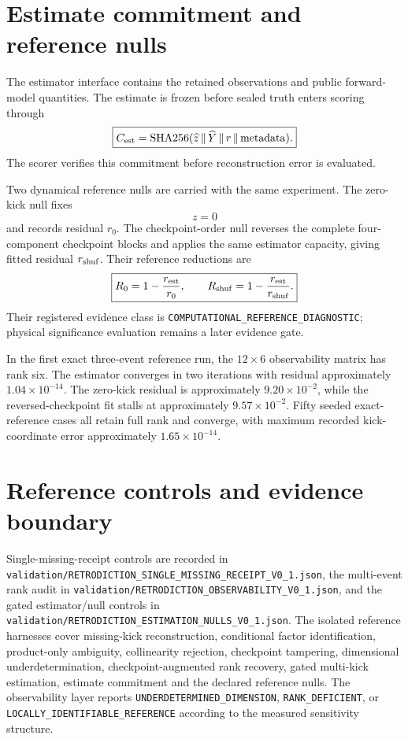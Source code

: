 \section{Estimate commitment and reference nulls}

The estimator interface contains the retained observations and public forward-model quantities. The estimate is frozen before sealed truth enters scoring through
\[
\boxed{
C_{\rm est}
=\operatorname{SHA256}(\widehat z\,\|\,\widehat Y\,\|\,r\,\|\,\mathrm{metadata}).
}
\]
The scorer verifies this commitment before reconstruction error is evaluated.

Two dynamical reference nulls are carried with the same experiment. The zero-kick null fixes
\[
z=0
\]
and records residual \(r_0\). The checkpoint-order null reverses the complete four-component checkpoint blocks and applies the same estimator capacity, giving fitted residual \(r_{\rm shuf}\). Their reference reductions are
\[
\boxed{
R_0=1-\frac{r_{\rm est}}{r_0},
\qquad
R_{\rm shuf}=1-\frac{r_{\rm est}}{r_{\rm shuf}}.
}
\]
Their registered evidence class is \texttt{COMPUTATIONAL\_REFERENCE\_DIAGNOSTIC}; physical significance evaluation remains a later evidence gate.

In the first exact three-event reference run, the \(12\times6\) observability matrix has rank six. The estimator converges in two iterations with residual approximately \(1.04\times10^{-14}\). The zero-kick residual is approximately \(9.20\times10^{-2}\), while the reversed-checkpoint fit stalls at approximately \(9.57\times10^{-2}\). Fifty seeded exact-reference cases all retain full rank and converge, with maximum recorded kick-coordinate error approximately \(1.65\times10^{-14}\).

\section{Reference controls and evidence boundary}

Single-missing-receipt controls are recorded in
\texttt{validation/RETRODICTION\_SINGLE\_MISSING\_RECEIPT\_V0\_1.json},
the multi-event rank audit in
\texttt{validation/RETRODICTION\_OBSERVABILITY\_V0\_1.json},
and the gated estimator/null controls in
\texttt{validation/RETRODICTION\_ESTIMATION\_NULLS\_V0\_1.json}.
The isolated reference harnesses cover missing-kick reconstruction, conditional factor identification, product-only ambiguity, collinearity rejection, checkpoint tampering, dimensional underdetermination, checkpoint-augmented rank recovery, gated multi-kick estimation, estimate commitment and the declared reference nulls. The observability layer reports \texttt{UNDERDETERMINED\_DIMENSION}, \texttt{RANK\_DEFICIENT}, or \texttt{LOCALLY\_IDENTIFIABLE\_REFERENCE} according to the measured sensitivity structure.

